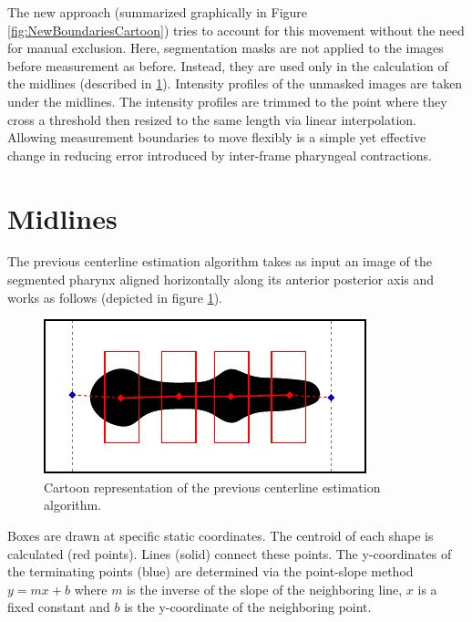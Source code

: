 The new approach (summarized graphically in Figure \ref{fig:NewBoundariesCartoon}) tries to account for this movement without the need for manual exclusion. Here, segmentation masks are not applied to the images before measurement as before. Instead, they are used only in the calculation of the midlines (described in \ref{Midlines}). Intensity profiles of the unmasked images are taken under the midlines. The intensity profiles are trimmed to the point where they cross a threshold then resized to the same length via linear interpolation. Allowing measurement boundaries to move flexibly is a simple yet effective change in reducing error introduced by inter-frame pharyngeal contractions.

\section{Midlines} \label{Midlines}

The previous centerline estimation algorithm takes as input an image of the segmented pharynx aligned horizontally along its anterior posterior axis and works as follows (depicted in figure \ref{fig:oldMidline}).

\begin{figure}[ht]
    \centering
    \includegraphics[scale=1.5]{Figures/rendered_files/old_midline_algorithm}
    \decoRule
    \caption[Previous centerline estimation algorithm]{Cartoon representation of the previous centerline estimation algorithm.}
    \label{fig:oldMidline}
\end{figure}

Boxes are drawn at specific static coordinates. The centroid of each shape is calculated (red points). Lines (solid) connect these points. The y-coordinates of the terminating points (blue) are determined via the point-slope method $y=mx+b$ where $m$ is the inverse of the slope of the neighboring line, $x$ is a fixed constant and $b$ is the y-coordinate of the neighboring point.

